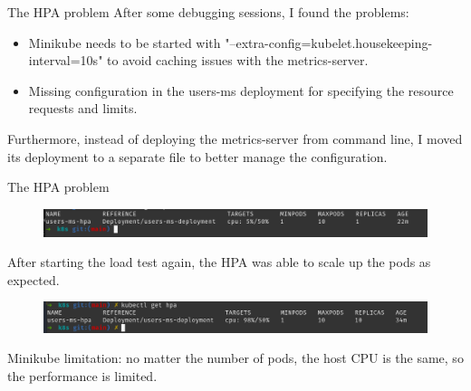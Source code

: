 \documentclass{beamer}
\begin{document}
\begin{frame}[fragile]{The HPA problem}
	After some debugging sessions, I found the problems:
	\begin{itemize}
		\item Minikube needs to be started with "--extra-config=kubelet.housekeeping-interval=10s" to avoid caching issues with the metrics-server.
		\item Missing configuration in the users-ms deployment for specifying the resource requests and limits.
	\end{itemize}

	Furthermore, instead of deploying the metrics-server from command line, I moved its deployment to a separate file to better manage the configuration.
\end{frame}

\begin{frame}[fragile]{The HPA problem}
	\begin{figure}
		\centering
		\includegraphics[width=1\linewidth]{./images/hpaFix1.png}
	\end{figure}
	After starting the load test again, the HPA was able to scale up the pods as expected.
	\begin{figure}
		\centering
		\includegraphics[width=1\linewidth]{./images/hpaFix3.png}
	\end{figure}
	Minikube limitation: no matter the number of pods, the host CPU is the same, so the performance is limited.
\end{frame}
	
\end{document}
